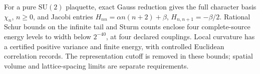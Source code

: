 For a pure \(\mathrm{SU}(2)\) plaquette, exact Gauss reduction gives the
full character basis \(\chi_n\), \(n\geq0\), and Jacobi entries
\(H_{nn}=\alpha n(n+2)+\beta\),
\(H_{n,n+1}=-\beta/2\). Rational Schur bounds on the infinite tail and
Sturm counts enclose four complete-source energy levels to width below
\(2^{-40}\), at four declared couplings. Local curvature has a certified
positive variance and finite energy, with controlled Euclidean correlation
records. The representation cutoff is removed in these bounds; spatial
volume and lattice-spacing limits are separate requirements.
